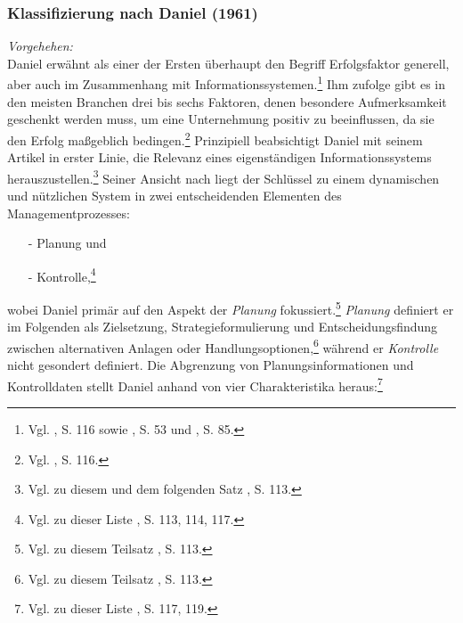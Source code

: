 \noindent
\subsubsection{Klassifizierung nach Daniel (1961)}
\textit{Vorgehehen:}\\\noindent
Daniel erwähnt als einer der Ersten überhaupt den Begriff Erfolgsfaktor generell, aber auch im Zusammenhang mit Informationssystemen.\footnote{Vgl. \cite{Daniel.1961}, S. 116 sowie \cite{Fortune.2006}, S. 53 und \cite{Rockart.1979}, S. 85.}
Ihm zufolge gibt es in den meisten Branchen drei bis sechs Faktoren, denen besondere Aufmerksamkeit geschenkt werden muss,
um eine Unternehmung positiv zu beeinflussen, da sie den Erfolg maßgeblich bedingen.\footnote{Vgl. \cite{Daniel.1961}, S. 116.}
Prinzipiell beabsichtigt Daniel mit seinem Artikel in erster Linie, die Relevanz eines eigenständigen Informationssystems 
herauszustellen.\footnote{Vgl. zu diesem und dem folgenden Satz \cite{Daniel.1961}, S. 113.}
Seiner Ansicht nach liegt der Schlüssel zu einem dynamischen und nützlichen System in zwei entscheidenden Elementen des Managementprozesses:
\begin{itemize}\itemsep0pt
\item[-]Planung und
\item[-]Kontrolle,\footnote{Vgl. zu dieser Liste \cite{Daniel.1961}, S. 113, 114, 117.}
\end{itemize}
wobei Daniel primär auf den Aspekt der \textit{Planung} fokussiert.\footnote{Vgl. zu diesem Teilsatz \cite{Daniel.1961}, S. 113.} 
\textit{Planung} definiert er im Folgenden als Zielsetzung, Strategieformulierung und Entscheidungsfindung zwischen alternativen
Anlagen oder Handlungsoptionen,\footnote{Vgl. zu diesem Teilsatz \cite{Daniel.1961}, S. 113.} während er \textit{Kontrolle} nicht gesondert definiert. 
Die Abgrenzung von Planungsinformationen und Kontrolldaten stellt Daniel anhand von vier Charakteristika heraus:\footnote{Vgl. zu dieser Liste \cite{Daniel.1961}, S. 117, 119.}
